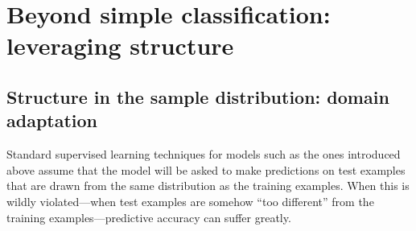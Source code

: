 \documentclass[11pt,letterpaper]{article}
\newcommand{\ensuretext}[1]{#1}
\newcommand{\nssmarker}{\ensuretext{\textcolor{magenta}{\ensuremath{^{\textsc{NS}}_{\textsc{S}}}}}}
\newcommand{\arkcomment}[3]{\ensuretext{\textcolor{#3}{[#1 #2]}}}
\newcommand{\nss}[1]{\arkcomment{\nssmarker}{#1}{magenta}}
\newcommand{\futureversion}[1]{}
\begin{document}





\futureversion{\section{Interpretation}\label{sec:interp}

\nss{caveats about interpretability}

\nss{statistical tests for social scientists}

\nss{impact measure}

\nss{standardization (divide real-valued features by variance?)}}

\section{Beyond simple classification: leveraging structure}\label{sec:structure}

% 
% 

\subsection{Structure in the sample distribution: domain adaptation}\label{sec:da}

Standard supervised learning techniques for models such as the ones introduced above 
assume that the model will be asked to make predictions on test examples 
that are drawn from the same distribution as the training examples. 
When this is wildly violated---when test examples are somehow ``too different'' 
from the training examples---predictive accuracy can suffer greatly.
\end{document}
